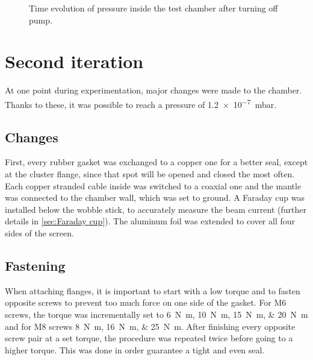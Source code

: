 \begin{figure}[ht]
	\centering
		
	\begin{tikzpicture}
		
	\end{tikzpicture}
	
	\caption{Time evolution of pressure inside the test chamber after turning off pump.}
	\label{fig:Time evolution of pressure inside the test chamber after turning off pump}
\end{figure}


\section{Second iteration}
\label{sec:Second iteration}

At one point during experimentation, major changes were made to the chamber. Thanks to these, it was possible to reach a pressure of \SI{1.2e-7}{\milli\bar}.

\subsection{Changes}
\label{subsec:Changes}

First, every rubber gasket was exchanged to a copper one for a better seal, except at the cluster flange, since that spot will be opened and closed the most often. Each copper stranded cable inside was switched to a coaxial one and the mantle was connected to the chamber wall, which was set to ground. A Faraday cup was installed below the wobble stick, to accurately measure the beam current (further details in \cref{sec:Faraday cup}). The aluminum foil was extended to cover all four sides of the screen.

\subsection{Fastening}
\label{subsec:Fastening}

When attaching flanges, it is important to start with a low torque and to fasten opposite screws to prevent too much force on one side of the gasket. For M6 screws, the torque was incrementally set to \SIlist{6;10;15;20}{\newton\meter} and for M8 screws \SIlist{8;16;25}{\newton\meter}. After finishing every opposite screw pair at a set torque, the procedure was repeated twice before going to a higher torque. This was done in order guarantee a tight and even seal.